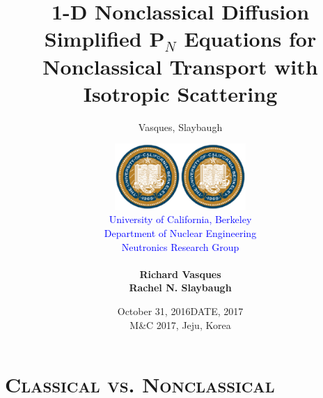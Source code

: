\documentclass[xcolor=x11names, compress]{beamer}
\title{1-D Nonclassical Diffusion }
\author{Vasques, Slaybaugh}
\date{October 31, 2016}
\renewcommand{\(}{\begin{columns}}
\renewcommand{\)}{\end{columns}}
\newcommand{\<}[1]{\begin{column}{#1}}
\renewcommand{\>}{\end{column}}
\begin{document}

\begin{frame}[plain]
\title{Simplified P$_N$ Equations for Nonclassical Transport with Isotropic Scattering}
\author{
\begin{tabular}{ccc}
\multirow{6}{65pt}{\includegraphics[height=2.5cm]{images/title_bk.eps}}
& &
\multirow{6}{65pt}{\includegraphics[height=2.5cm]{images/title_bk.eps}} \\
&{\small\textcolor{blue}{University of California, Berkeley}} &\\
&{\small\textcolor{blue}{Department of Nuclear Engineering}}&\\
&{\small \textcolor{blue}{Neutronics Research Group}}&\\
& &\\
&\textbf{Richard Vasques}&\\
&\textbf{Rachel N. Slaybaugh}&\\
\end{tabular}}
\date{DATE, 2017 \\ M\&C 2017, Jeju, Korea}
\titlepage
\end{frame}


\section{\scshape Classical vs. Nonclassical}
\end{document}
